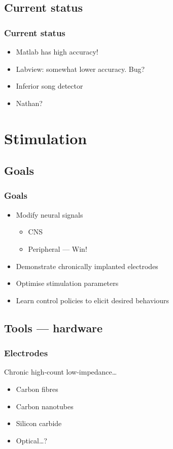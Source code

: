 \documentclass{beamer}
\begin{document}
\subsection{Current status}

\begin{frame}
  \frametitle{Current status}
  \begin{itemize}
    \item Matlab has high accuracy!
    \item Labview: somewhat lower accuracy.  Bug?
    \item Inferior song detector
    \item Nathan?
  \end{itemize}
\end{frame}


\section{Stimulation}
\subsection{Goals}

\begin{frame}
  \frametitle{Goals}
  \begin{itemize}
  \item Modify neural signals
    \begin{itemize}
    \item CNS
    \item Peripheral --- Win!
    \end{itemize}
  \item Demonstrate chronically implanted electrodes
  \item Optimise stimulation parameters
  \item Learn control policies to elicit desired behaviours
  \end{itemize}
\end{frame}


\subsection{Tools --- hardware}

\begin{frame}
  \frametitle{Electrodes}
  Chronic high-count low-impedance\dots
  \begin{itemize}
    \item Carbon fibres
    \item Carbon nanotubes
    \item Silicon carbide
    \item Optical\dots?
  \end{itemize}
\end{frame}
\end{document}
